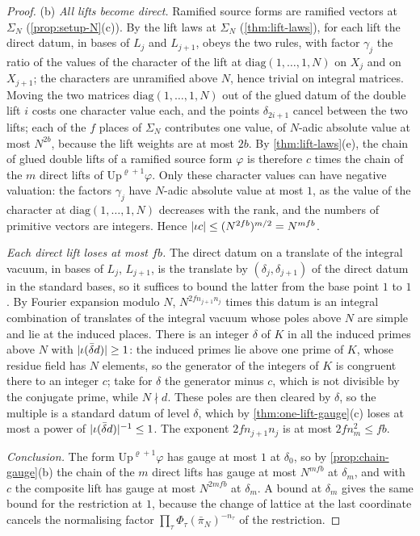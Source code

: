 \begin{proof}
(b) \emph{All lifts become direct.} Ramified source forms are ramified vectors at $\Sigma_N$ (\cref{prop:setup-N}(c)). By the lift laws at $\Sigma_N$ (\cref{thm:lift-laws}), for each lift the direct datum, in bases of $L_j$ and $L_{j+1}$, obeys the two rules, with factor $\gamma_j$ the ratio of the values of the character of the lift at $\mathrm{diag}(1,\dots,1,N)$ on $X_j$ and on $X_{j+1}$; the characters are unramified above $N$, hence trivial on
integral matrices. Moving the two matrices $\mathrm{diag}(1,\dots,1,N)$ out of the glued datum of the double lift $i$ costs one character value each, and the points $\delta_{2i+1}$ cancel between the two lifts; each of the $f$ places of $\Sigma_N$ contributes one value, of $N$-adic absolute value at most $N^{2b}$, because the lift weights are at most $2b$. By
\cref{thm:lift-laws}(e), the chain of glued double lifts of a ramified source form $\varphi$ is therefore $c$ times the chain of the $m$ direct lifts of $\mathrm{Up}^{\varrho+1}\varphi$. Only these character values can have negative valuation: the factors $\gamma_j$ have $N$-adic absolute value at most $1$, as the value of the character at $\mathrm{diag}(1,\dots,1,N)$ decreases with the rank, and the numbers of primitive vectors are integers. Hence $\lvert \iota c\rvert\le(N^{2fb})^{m/2}=N^{mfb}$.

\emph{Each direct lift loses at most $fb$.} The direct datum on a translate of the integral vacuum, in bases of $L_j$, $L_{j+1}$, is the translate by $(\delta_j,\delta_{j+1})$ of the direct datum in the standard bases, so it suffices to bound the latter from the base point $1$ to $1$. By Fourier expansion modulo $N$, $N^{2fn_{j+1}n_j}$ times this datum is an integral combination
of translates of the integral vacuum whose poles above $N$ are simple and lie at the induced places. There is an integer $\delta$ of $K$ in all the induced primes above $N$ with $\lvert \iota(\bar\delta d)\rvert\ge1$: the induced primes lie above one prime of $K$, whose residue field has $N$ elements, so the generator of the integers of $K$ is congruent there to an integer $c$; take for $\delta$ the generator minus $c$, which is not divisible by the conjugate prime, while $N\nmid d$. These poles are then cleared by $\delta$, so the multiple is a standard datum of level $\delta$, which by \cref{thm:one-lift-gauge}(c) loses at most a power of $\lvert \iota(\bar\delta d)\rvert^{-1}\le1$. The exponent $2fn_{j+1}n_j$ is at most $2fn_m^2\le fb$.

\emph{Conclusion.} The form $\mathrm{Up}^{\varrho+1}\varphi$ has gauge at most $1$ at $\delta_0$, so by \cref{prop:chain-gauge}(b) the chain of the $m$ direct lifts has gauge at most $N^{mfb}$ at $\delta_m$, and with $c$ the composite lift has gauge at most $N^{2mfb}$ at $\delta_m$. A bound at $\delta_m$ gives the same bound for the restriction at $1$, because the change of
lattice at the last coordinate cancels the normalising factor $\prod_\tau\Phi_\tau(\bar\pi_N)^{-n_\tau}$ of the restriction.
\end{proof}

